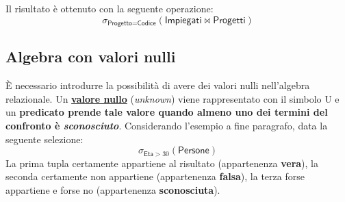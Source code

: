 \documentclass[a4paper]{article}
\begin{document}
	\noindent
	Il risultato è ottenuto con la seguente operazione:
	\begin{equation*}
		\sigma_{\textsf{Progetto} = \textsf{Codice}}\left(\textsf{Impiegati} \Join \textsf{Progetti}\right)
	\end{equation*}\newpage
	
	\subsection{Algebra con valori nulli}
	
	È necessario introdurre la possibilità di avere dei valori nulli nell'algebra relazionale. Un \textcolor{Red3}{\textbf{\underline{valore nullo}}} (\emph{unknown}) viene rappresentato con il simbolo U e un \textbf{predicato prende tale valore quando almeno uno dei termini del confronto è \emph{sconosciuto}}. Considerando l'esempio a fine paragrafo, data la seguente selezione:
	\begin{equation*}
		\sigma_{\textsf{Eta} > 30}\left(\textsf{Persone}\right)
	\end{equation*}
	La prima tupla certamente appartiene al risultato (appartenenza \textbf{vera}), la seconda certamente non appartiene (appartenenza \textbf{falsa}), la terza forse appartiene e forse no (appartenenza \textbf{sconosciuta}).\newline
	
\end{document}
